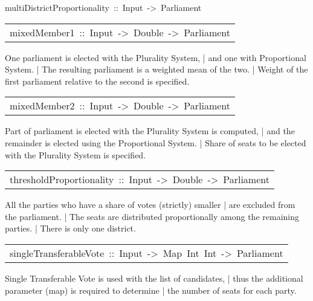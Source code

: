 \begin{haddockdesc}
\item[
multiDistrictProportionality\ ::\ Input\ ->\ Parliament
]
\end{haddockdesc}
\begin{haddockdesc}
\item[\begin{tabular}{@{}l}
mixedMember1\ ::\ Input\ ->\ Double\ ->\ Parliament
\end{tabular}]\haddockbegindoc
One parliament is elected with the Plurality System,
 | and one with Proportional System.
 | The resulting parliament is a weighted mean of the two.
 | Weight of the first parliament relative to the second is specified.\par

\end{haddockdesc}
\begin{haddockdesc}
\item[\begin{tabular}{@{}l}
mixedMember2\ ::\ Input\ ->\ Double\ ->\ Parliament
\end{tabular}]\haddockbegindoc
Part of parliament is elected with the Plurality System is computed,
 | and the remainder is elected using the Proportional System.
 | Share of seats to be elected with the Plurality System is specified.\par

\end{haddockdesc}
\begin{haddockdesc}
\item[\begin{tabular}{@{}l}
thresholdProportionality\ ::\ Input\ ->\ Double\ ->\ Parliament
\end{tabular}]\haddockbegindoc
All the parties who have a share of votes (strictly) smaller  
 | are excluded from the parliament. 
 | The seats are distributed proportionally among the remaining parties. 
 | There is only one district.\par

\end{haddockdesc}
\begin{haddockdesc}
\item[\begin{tabular}{@{}l}
singleTransferableVote\ ::\ Input\ ->\ Map\ Int\ Int\ ->\ Parliament
\end{tabular}]\haddockbegindoc
Single Transferable Vote is used with the list of candidates,
 | thus the additional parameter (map) is required to determine
 | the number of seats for each party.\par

\end{haddockdesc}